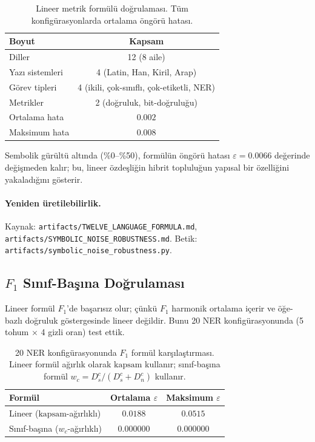 \documentclass[11pt,a4paper]{article}
\begin{document}
\begin{table}[h]
\centering
\caption{Lineer metrik formülü doğrulaması. Tüm konfigürasyonlarda
ortalama öngörü hatası.}
\label{tab:linear}
\small
\begin{tabular}{lc}
\toprule
Boyut & Kapsam \\
\midrule
Diller           & 12 (8 aile) \\
Yazı sistemleri  & 4 (Latin, Han, Kiril, Arap) \\
Görev tipleri    & 4 (ikili, çok-sınıflı, çok-etiketli, NER) \\
Metrikler        & 2 (doğruluk, bit-doğruluğu) \\
\midrule
Ortalama hata    & $0.002$ \\
Maksimum hata    & $0.008$ \\
\bottomrule
\end{tabular}
\end{table}

Sembolik gürültü altında (\%0--\%50), formülün öngörü hatası
$\varepsilon = 0.0066$ değerinde değişmeden kalır; bu, lineer özdeşliğin
hibrit topluluğun yapısal bir özelliğini yakaladığını gösterir.

\paragraph{Yeniden üretilebilirlik.}
Kaynak: \texttt{artifacts/TWELVE\_LANGUAGE\_FORMULA.md},
\texttt{artifacts/SYMBOLIC\_NOISE\_ROBUSTNESS.md}.
Betik: \texttt{artifacts/symbolic\_noise\_robustness.py}.

\subsection{$F_1$ Sınıf-Başına Doğrulaması}
\label{sec:exp-f1}

Lineer formül $F_1$'de başarısız olur; çünkü $F_1$ harmonik ortalama
içerir ve öğe-bazlı doğruluk göstergesinde lineer değildir. Bunu 20 NER
konfigürasyonunda (5 tohum $\times$ 4 gizli oran) test ettik.

\begin{table}[h]
\centering
\caption{20 NER konfigürasyonunda $F_1$ formül karşılaştırması.
Lineer formül ağırlık olarak $\text{kapsam}$ kullanır; sınıf-başına
formül $w_c = D_s^c / (D_s^c + D_n^c)$ kullanır.}
\label{tab:f1}
\small
\begin{tabular}{lcc}
\toprule
Formül & Ortalama $\varepsilon$ & Maksimum $\varepsilon$ \\
\midrule
Lineer ($\text{kapsam}$-ağırlıklı)     & $0.0188$ & $0.0515$ \\
Sınıf-başına ($w_c$-ağırlıklı) & $0.000000$ & $0.000000$ \\
\bottomrule
\end{tabular}
\end{table}
\end{document}
